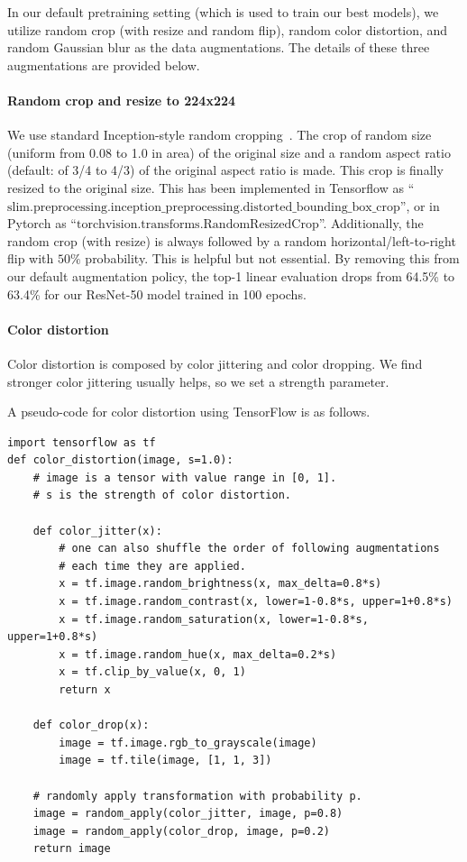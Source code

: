\documentclass{article}
\begin{document}
In our default pretraining setting (which is used to train our best models), we utilize random crop (with resize and random flip), random color distortion, and random Gaussian blur as the data augmentations. The details of these three augmentations are provided below.

\paragraph{Random crop and resize to 224x224} We use standard Inception-style random cropping~\cite{szegedy2015going}. The crop of random size (uniform from 0.08 to 1.0 in area) of the original size and a random aspect ratio (default: of 3/4 to 4/3) of the original aspect ratio is made. This crop is finally resized to the original size. This has been implemented in Tensorflow as ``$\mathrm{slim.preprocessing.inception\_preprocessing.distorted\_bounding\_box\_crop}$'', or in Pytorch as ``$\mathrm{torchvision.transforms.RandomResizedCrop}$''. Additionally, the random crop (with resize) is always followed by a random horizontal/left-to-right flip with $50\%$ probability. This is helpful but not essential. By removing this from our default augmentation policy, the top-1 linear evaluation drops from 64.5\% to 63.4\% for our ResNet-50 model trained in 100 epochs.

\paragraph{Color distortion} Color distortion is composed by color jittering and color dropping. We find stronger color jittering usually helps, so we set a strength parameter. 

A pseudo-code for color distortion using TensorFlow is as follows.
\begin{verbatim}
import tensorflow as tf
def color_distortion(image, s=1.0):
    # image is a tensor with value range in [0, 1].
    # s is the strength of color distortion.
    
    def color_jitter(x):
        # one can also shuffle the order of following augmentations
        # each time they are applied.
        x = tf.image.random_brightness(x, max_delta=0.8*s)
        x = tf.image.random_contrast(x, lower=1-0.8*s, upper=1+0.8*s)
        x = tf.image.random_saturation(x, lower=1-0.8*s, upper=1+0.8*s)
        x = tf.image.random_hue(x, max_delta=0.2*s)
        x = tf.clip_by_value(x, 0, 1)
        return x
    
    def color_drop(x):
        image = tf.image.rgb_to_grayscale(image)
        image = tf.tile(image, [1, 1, 3])
        
    # randomly apply transformation with probability p.
    image = random_apply(color_jitter, image, p=0.8)
    image = random_apply(color_drop, image, p=0.2)
    return image
\end{verbatim}
\end{document}
